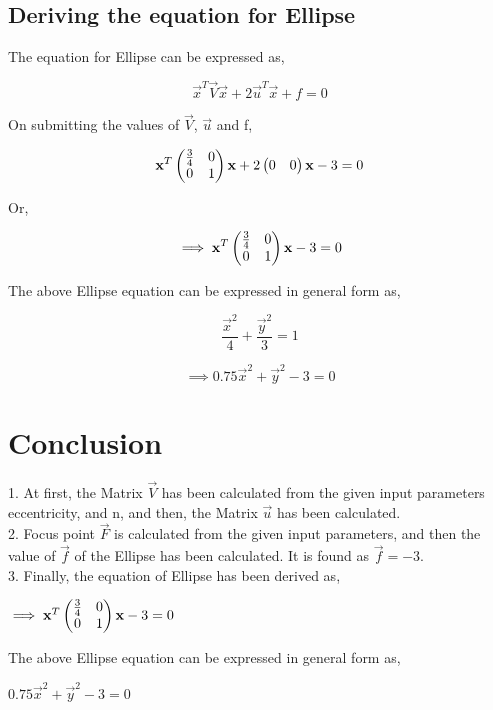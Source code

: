 \documentclass[journal,10pt,twocolumn]{article}
\begin{document}
\subsection{Deriving the equation for Ellipse}
\vspace{0.25cm}
\begin{flushleft}
The equation for Ellipse can be expressed as,
\end{flushleft}
\vspace{0.15cm}
\begin{equation}
    \vec{x}^T \vec{V} \vec{x} + 2\vec{u}^T\vec{x}+f=0
\end{equation}

\vspace{0.2cm}
\begin{flushleft}
On submitting the values of $\vec{V}$,  $\vec{u}$ and f,\\
\end{flushleft}
\vspace{0.2cm}
\begin{equation}
    \mathbf{x}^T \begin{pmatrix}\frac{3}{4} & 0 \\ 0 & 1\end{pmatrix} \mathbf{x} +2 \begin{pmatrix}0&0\end{pmatrix} \mathbf{x} -3 =0
\end{equation}
\begin{flushleft}
Or,
\end{flushleft}
\begin{equation}
   \implies \mathbf{x}^T \begin{pmatrix}\frac{3}{4} & 0 \\ 0 & 1\end{pmatrix} \mathbf{x} -3 =0
\end{equation}

\begin{flushleft}
The above Ellipse equation can be expressed in general form as,
\end{flushleft}
\begin{equation}
    \frac{\vec{x}^2}{4}+\frac{\vec{y}^2}{3} =1
\end{equation}

\begin{equation}
    \implies 0.75\vec{x}^2+\vec{y}^2-3=0
\end{equation}

\section{Conclusion}
\begin{flushleft}
1. At first, the Matrix $\vec{V}$ has been calculated from the given input parameters eccentricity, and n, and then, the Matrix $\vec{u}$ has been calculated.\\
\vspace{0.15cm}
2. Focus point $\vec{F}$ is calculated from the given input parameters, and then the value of $\vec{f}$ of the Ellipse has been calculated. It is found as $\vec{f}=-3$.\\
\vspace{0.15cm}
3. Finally, the equation of Ellipse has been derived as, \\
\end{flushleft}

\begin{center}
   $\implies \mathbf{x}^T \begin{pmatrix}\frac{3}{4} & 0 \\ 0 & 1\end{pmatrix} \mathbf{x} -3 =0$
\end{center}
\begin{flushleft}
The above Ellipse equation can be expressed in general form as,
\end{flushleft}
\begin{center}
    $0.75\vec{x}^2+\vec{y}^2-3=0$
\end{center}
\end{document}
